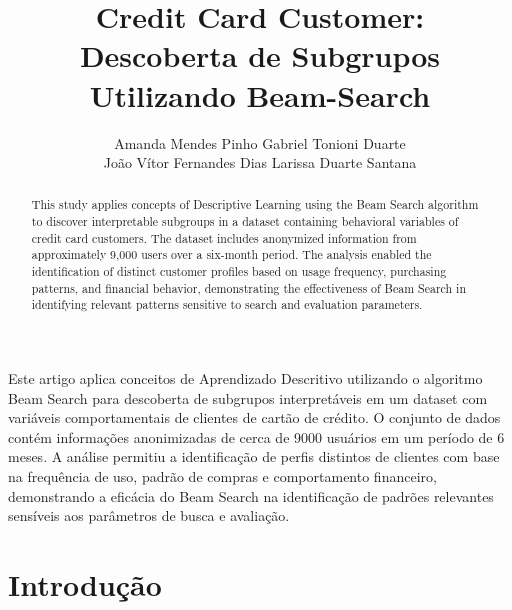 \documentclass[12pt]{article}
\title{
    Credit Card Customer: \\
    Descoberta de Subgrupos Utilizando Beam-Search
}
\author{
  Amanda Mendes Pinho\inst{1}
  Gabriel Tonioni Duarte\inst{2}\\
  João Vítor Fernandes Dias\inst{2}
  Larissa Duarte Santana\inst{2}
}
\begin{document}
\maketitle

\begin{center}
\end{center}

\begin{abstract}
This study applies concepts of Descriptive Learning using the Beam Search algorithm to discover interpretable subgroups in a dataset containing behavioral variables of credit card customers. The dataset includes anonymized information from approximately 9,000 users over a six-month period. The analysis enabled the identification of distinct customer profiles based on usage frequency, purchasing patterns, and financial behavior, demonstrating the effectiveness of Beam Search in identifying relevant patterns sensitive to search and evaluation parameters.
\end{abstract}

\begin{resumo} 
Este artigo aplica conceitos de Aprendizado Descritivo utilizando o algoritmo Beam Search para descoberta de subgrupos interpretáveis em um dataset com variáveis comportamentais de clientes de cartão de crédito. O conjunto de dados contém informações anonimizadas de cerca de 9000 usuários em um período de 6 meses. A análise permitiu a identificação de perfis distintos de clientes com base na frequência de uso, padrão de compras e comportamento financeiro, demonstrando a eficácia do Beam Search na identificação de padrões relevantes sensíveis aos parâmetros de busca e avaliação.
\end{resumo}

\section{Introdução}

\end{document}
